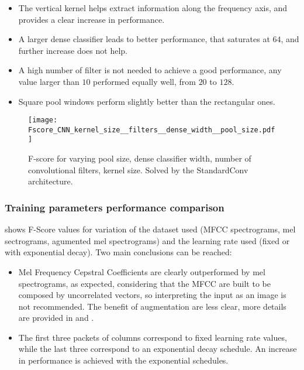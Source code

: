 \begin{itemize}
    \item The vertical kernel helps extract information along the frequency axis,
        and provides a clear increase in performance.
    \item A larger dense classifier leads to better performance,
        that saturates at $64$, and further increase does not help.
    \item A high number of filter is not needed to achieve a good performance,
        any value larger than $10$ performed equally well, from $20$ to $128$.
    \item Square pool windows perform slightly better than the rectangular ones.
\end{itemize}


\begin{figure*}[h!]
    \centering
    \texttt{[image: Fscore\_CNN\_kernel\_size\_\_filters\_\_dense\_width\_\_pool\_size.pdf]}
    \caption{F-score for varying
        pool size,
        dense classifier width,
        number of convolutional filters,
        kernel size.
        Solved by the StandardConv architecture.
    }%
    \label{fig:cnn_comparison_kernel_filter_dense_pool}
\end{figure*}

\subsubsection{Training parameters performance comparison}

 shows F-Score values for
variation of
the dataset used (MFCC spectrograms, mel sectrograms, agumented mel spectrograms)
and the learning rate used (fixed or with exponential decay).
Two main conclusions can be reached:
\begin{itemize}
    \item 
        Mel Frequency Cepstral Coefficients are clearly outperformed by mel
        spectrograms, as expected, considering that the MFCC are built to be composed
        by uncorrelated vectors, so interpreting the input as an image is not
        recommended.
        The benefit of augmentation are less clear, more details are provided
        in  and
        .
    \item 
        The first three packets of columns correspond to fixed learning rate values,
        while the last three correspond to an exponential decay schedule.
        An increase in performance is achieved with the exponential schedules.
\end{itemize}

